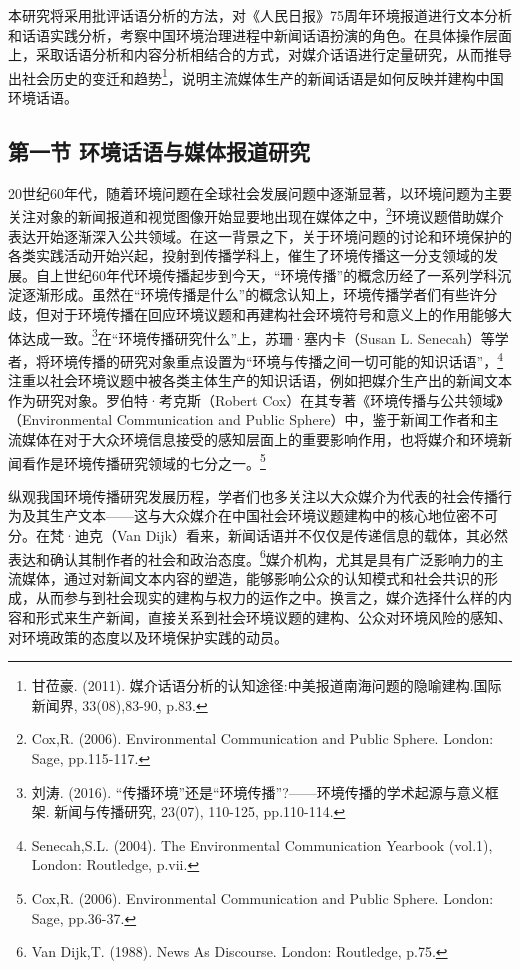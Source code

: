 本研究将采用批评话语分析的方法，对《人民日报》75周年环境报道进行文本分析和话语实践分析，考察中国环境治理进程中新闻话语扮演的角色。在具体操作层面上，采取话语分析和内容分析相结合的方式，对媒介话语进行定量研究，从而推导出社会历史的变迁和趋势\footnote{甘莅豪.
  (2011). 媒介话语分析的认知途径:中美报道南海问题的隐喻建构.国际新闻界,
  33(08),83-90, p.83.}，说明主流媒体生产的新闻话语是如何反映并建构中国环境话语。

\subsection{第一节
环境话语与媒体报道研究}\label{ux7b2cux4e00ux8282-ux73afux5883ux8bddux8bedux4e0eux5a92ux4f53ux62a5ux9053ux7814ux7a76}

20世纪60年代，随着环境问题在全球社会发展问题中逐渐显著，以环境问题为主要关注对象的新闻报道和视觉图像开始显要地出现在媒体之中，\footnote{Cox,R.
  (2006). Environmental Communication and Public Sphere. London: Sage,
  pp.115-117.}环境议题借助媒介表达开始逐渐深入公共领域。在这一背景之下，关于环境问题的讨论和环境保护的各类实践活动开始兴起，投射到传播学科上，催生了环境传播这一分支领域的发展。自上世纪60年代环境传播起步到今天，``环境传播''的概念历经了一系列学科沉淀逐渐形成。虽然在``环境传播是什么''的概念认知上，环境传播学者们有些许分歧，但对于环境传播在回应环境议题和再建构社会环境符号和意义上的作用能够大体达成一致。\footnote{刘涛.
  (2016).
  ``传播环境''还是``环境传播''?------环境传播的学术起源与意义框架.
  新闻与传播研究, 23(07), 110-125, pp.110-114.}在``环境传播研究什么''上，苏珊·塞内卡（Susan
L.
Senecah）等学者，将环境传播的研究对象重点设置为``环境与传播之间一切可能的知识话语''，\footnote{Senecah,S.L.
  (2004). The Environmental Communication Yearbook (vol.1), London:
  Routledge, p.vii.}注重以社会环境议题中被各类主体生产的知识话语，例如把媒介生产出的新闻文本作为研究对象。罗伯特·考克斯（Robert
Cox）在其专著《环境传播与公共领域》（Environmental Communication and
Public
Sphere）中，鉴于新闻工作者和主流媒体在对于大众环境信息接受的感知层面上的重要影响作用，也将媒介和环境新闻看作是环境传播研究领域的七分之一。\footnote{Cox,R.
  (2006). Environmental Communication and Public Sphere. London: Sage,
  pp.36-37.}

纵观我国环境传播研究发展历程，学者们也多关注以大众媒介为代表的社会传播行为及其生产文本------这与大众媒介在中国社会环境议题建构中的核心地位密不可分。在梵·迪克（Van
Dijk）看来，新闻话语并不仅仅是传递信息的载体，其必然表达和确认其制作者的社会和政治态度。\footnote{Van
  Dijk,T. (1988). News As Discourse. London: Routledge, p.75.}媒介机构，尤其是具有广泛影响力的主流媒体，通过对新闻文本内容的塑造，能够影响公众的认知模式和社会共识的形成，从而参与到社会现实的建构与权力的运作之中。换言之，媒介选择什么样的内容和形式来生产新闻，直接关系到社会环境议题的建构、公众对环境风险的感知、对环境政策的态度以及环境保护实践的动员。

